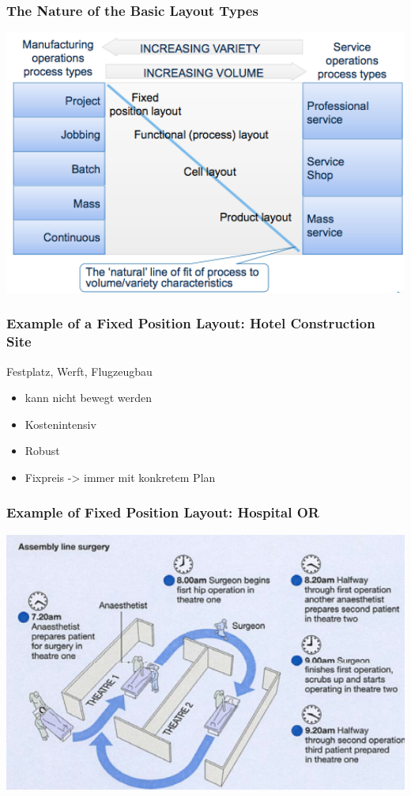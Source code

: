 \subsubsection{The Nature of the Basic Layout Types}
\includegraphics[width=1\textwidth]{W05/basiclayouttypes}
\subsubsection{Example of a Fixed Position Layout: Hotel Construction Site}
Festplatz, Werft, Flugzeugbau
\begin{itemize}
\item kann nicht bewegt werden 
\item Kostenintensiv
\item Robust
\item Fixpreis -> immer mit konkretem Plan
\end{itemize}
\subsubsection{Example of  Fixed Position Layout: Hospital OR}
\includegraphics[width=1\textwidth]{W05/assemblylinesurgery}
